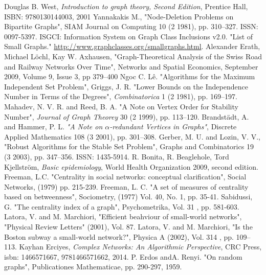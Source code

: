 \documentclass[14pt, oneside, a4paper, openany]{scrartcl}
\begin{document}
\printindex
\newpage
\begin{thebibliography}{9}
	Douglas B. West,
	\textit{Introduction to graph theory, Second Edition},
	Prentice Hall, ISBN: 9780130144003, 2001
	Yannakakis M.,
	"Node-Deletion Problems on Bipartite Graphs",
	SIAM Journal on Computing 10 (2 1981), pp. 310–327. ISSN: 0097-5397.
	ISGCI: Information System on Graph Class Inclusions v2.0. "List of Small Graphs." \href{http://www.graphclasses.org/smallgraphs.html}{http://www.graphclasses.org/smallgraphs.html}.
	Alexander Erath, Michael Löchl, Kay W. Axhausen,
	"Graph-Theoretical Analysis of the Swiss Road and Railway Networks Over Time", 
	Networks and Spatial Economics,
	September 2009, Volume 9, Issue 3, pp 379–400
	Ngoc C. Lê.
	"Algorithms for the Maximum Independent Set Problem",
	Griggs, J. R.
	"Lower Bounds on the Independence Number in Terms of the Degrees",
	\textit{Combinatorica} 1 (2 1981), pp. 169–197.
	Mahadev, N. V. R. and Reed, B. A.
	"A Note on Vertex Order for Stability Number",
	\textit{Journal of Graph Theorey} 30 (2 1999), pp. 113–120.
	Brandstädt, A. and Hammer, P. L.
	\textit{"A Note on $\alpha$-redundant Vertices in Graphs"},
	Discrete Applied Mathematics 108 (3 2001), pp. 301–308.
	Gerber, M. U. and Lozin, V. V.,
	"Robust Algorithms for the Stable Set Problem",
	Graphs and Combinatorics 19 (3 2003), pp. 347–356. ISSN: 1435-5914.
	R. Bonita, R. Beaglehole, Tord Kjellström,
	\textit{Basic epidemiology},
	World Health Organization 2009, second edition.
	Freeman, L.C.
	"Centrality in social networks: conceptual clarification",
	Social Networks, (1979) pp. 215-239.
	Freeman, L. C.
	"A set of measures of centrality based on betweenness",
	Sociometry, (1977) Vol. 40, No. 1, pp. 35-41.
	Sabidussi, G. 
	"The centrality index of a graph",
	 Psychometrika, Vol. 31 , pp. 581-603.
	 Latora, V. and M. Marchiori,
	 "Efficient beahviour of small-world networks",
	 "Physical Review Letters" (2001), Vol. 87.
	 Latora, V. and M. Marchiori, 
	 "Is the Boston subway a small-world network?",
	 Physica A (2002), Vol. 314 , pp. 109–113.
	 Kayhan Erciyes,
	 \textit{Complex Networks: An Algorithmic Perspective},
	 CRC Press, isbn: 1466571667, 9781466571662, 2014.
	 P. Erdos andA. Renyi.
	 "On random graphs",
	 Publicationes Mathematicae, pp. 290-297, 1959.
\end{thebibliography}
\end{document}
